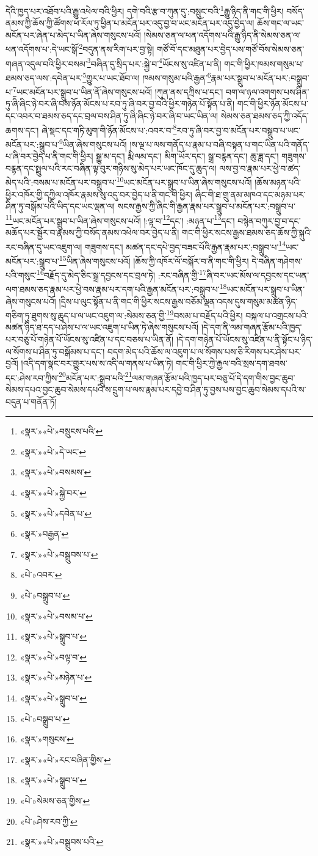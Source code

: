དེའི་ཁྱད་པར་འཐོབ་པའི་རྒྱུ་འཕེལ་བའི་ཕྱིར། དགེ་བའི་རྩ་བ་ཀུན་དུ་:བསྲུང་བའི་\footnote{«སྣར་»«པེ་»བསྲུངས་པའི་}རྒྱུ་ཉིད་ནི་གང་གི་ཕྱིར། བསོད་ནམས་ཀྱི་ཆོས་ཀྱི་ཚོགས་ཕ་རོལ་ཏུ་ཕྱིན་པ་མངོན་པར་འདུ་བྱ་བ་ཡང་མངོན་པར་འདུ་བྱེད་ལ། ཆོས་གང་ལ་ཡང་མངོན་པར་ཞེན་པ་མེད་པ་ཡིན་ཞེས་གསུངས་པའོ། །སེམས་ཅན་ལ་ཕན་འདོགས་པའི་རྒྱུ་ཉིད་ནི་སེམས་ཅན་ལ་ཕན་འདོགས་པ་:དེ་ཡང་སྒོ་\footnote{«སྣར་»«པེ་»དེ་ཡང་}བདུན་ནས་རིག་པར་བྱ་སྟེ། གཙོ་བོ་དང་མཐུན་པར་བྱེད་པས་གཙོ་བོས་སེམས་ཅན་གཞན་འདུལ་བའི་ཕྱིར་བསམ་\footnote{«སྣར་»«པེ་»བསམས་}བཞིན་དུ་སྲིད་པར་:སྐྱེ་བ་\footnote{«སྣར་»«པེ་»སྐྱེ་བར་}ཡོངས་སུ་འཛིན་པ་ནི། གང་གི་ཕྱིར་ཁམས་གསུམ་པ་ཐམས་ཅད་ལས་:དབེན་པར་\footnote{«སྣར་»«པེ་»དབེན་པ་}གྱུར་པ་ཡང་ཐོབ་ལ། ཁམས་གསུམ་པའི་རྒྱན་\footnote{«སྣར་»བརྒྱན་}རྣམ་པར་སྒྲུབ་པ་མངོན་པར་:བསྒྲུབ་པ་\footnote{«སྣར་»«པེ་»བསྒྲུབས་པ་}ཡང་མངོན་པར་སྒྲུབ་པ་ཡིན་ནོ་ཞེས་གསུངས་པའོ། །ཀུན་ནས་དཀྲིས་པ་དང་། བག་ལ་ཉལ་འགགས་པས་ཤིན་ཏུ་ཞི་ཞིང་ཉེ་བར་ཞི་བས་ཉོན་མོངས་པ་རབ་ཏུ་ཞི་བར་བྱ་བའི་ཕྱིར་གཉེན་པོ་སྟོན་པ་ནི། གང་གི་ཕྱིར་ཉོན་མོངས་པ་དང་འབར་བ་ཐམས་ཅད་དང་བྲལ་བས་ཤིན་ཏུ་ཞི་ཞིང་ཉེ་བར་ཞི་བ་ཡང་ཡིན་ལ། སེམས་ཅན་ཐམས་ཅད་ཀྱི་འདོད་ཆགས་དང་། ཞེ་སྡང་དང་གཏི་མུག་གི་ཉོན་མོངས་པ་:འབར་བ་\footnote{«པེ་»འབར་}རབ་ཏུ་ཞི་བར་བྱ་བ་མངོན་པར་བསྒྲུབ་པ་ཡང་མངོན་པར་:སྒྲུབ་པ་\footnote{«པེ་»བསྒྲུབ་པ་}ཡིན་ཞེས་གསུངས་པའོ། །ས་ལྔ་པ་ལས་གནོད་པ་རྣམ་པ་བཞི་བསྟན་པ་གང་ཡིན་པའི་གནོད་པ་ཞི་བར་བྱེད་པ་ནི་གང་གི་ཕྱིར། སྒྱུ་མ་དང་། རྨི་ལམ་དང་། མིག་ཡོར་དང་། སྒྲ་བརྙན་དང་། ཆུ་ཟླ་དང་། གཟུགས་བརྙན་དང་སྤྲུལ་པའི་རང་བཞིན་ལྟ་བུར་གཉིས་སུ་མེད་པར་ཡང་ཁོང་དུ་ཆུད་ལ། ལས་བྱ་བ་རྣམ་པར་ཕྱེ་བ་ཚད་མེད་པའི་:བསམ་པ་མངོན་པར་བསྒྲུབ་པ་\footnote{«སྣར་»«པེ་»བསམ་པ་}ཡང་མངོན་པར་སྒྲུབ་པ་ཡིན་ཞེས་གསུངས་པའོ། །ཆོས་མཉན་པའི་ཕྱིར་འཁོར་གྱི་དཀྱིལ་འཁོར་རྣམས་སུ་འདུ་བར་བྱེད་པ་ནི་གང་གི་ཕྱིར། ཞིང་གི་ཐ་གྲུ་ནམ་མཁའ་དང་མཉམ་པར་ཤིན་ཏུ་བསྒོམ་པའི་ཡིད་དང་ཡང་ལྡན་ལ། སངས་རྒྱས་ཀྱི་ཞིང་གི་རྒྱན་རྣམ་པར་སྒྲུབ་པ་མངོན་པར་:བསྒྲུབ་པ་\footnote{«སྣར་»«པེ་»སྒྲུབ་པ་}ཡང་མངོན་པར་སྒྲུབ་པ་ཡིན་ཞེས་གསུངས་པའོ། །:ལྟ་བ་\footnote{«སྣར་»«པེ་»བལྟ་བ་}དང་། :མཉན་པ་\footnote{«སྣར་»«པེ་»མཉེན་པ་}དང་། བསྙེན་བཀུར་བྱ་བ་དང་མཆོད་པར་སྦྱོར་བ་རྣམས་ཀྱི་བསོད་ནམས་འཕེལ་བར་བྱེད་པ་ནི། གང་གི་ཕྱིར་སངས་རྒྱས་ཐམས་ཅད་ཆོས་ཀྱི་སྐུའི་རང་བཞིན་དུ་ཡང་འཇུག་ལ། གཟུགས་དང་། མཚན་དང་དཔེ་བྱད་བཟང་པོའི་རྒྱན་རྣམ་པར་:བསྒྲུབ་པ་\footnote{«སྣར་»«པེ་»སྒྲུབ་པ་}ཡང་མངོན་པར་:སྒྲུབ་པ་\footnote{«པེ་»བསྒྲུབ་པ་}ཡིན་ཞེས་གསུངས་པའོ། །ཆོས་ཀྱི་འཁོར་ལོ་བསྐོར་བ་ནི་གང་གི་ཕྱིར། དེ་བཞིན་གཤེགས་པའི་གསུང་\footnote{«སྣར་»གསུངས་}བརྗོད་དུ་མེད་ཅིང་སྒྲ་དབྱངས་དང་བྲལ་ཏེ། :རང་བཞིན་གྱི་\footnote{«སྣར་»«པེ་»རང་བཞིན་གྱིས་}ཞི་བར་ཡང་མོས་ལ་དབྱངས་དང་ཡན་ལག་ཐམས་ཅད་རྣམ་པར་ཕྱེ་བས་རྣམ་པར་དག་པའི་རྒྱན་མངོན་པར་:བསྒྲུབ་པ་\footnote{«སྣར་»«པེ་»སྒྲུབ་པ་}ཡང་མངོན་པར་སྒྲུབ་པ་ཡིན་ཞེས་གསུངས་པའོ། །དྲིས་པ་ལུང་སྟོན་པ་ནི་གང་གི་ཕྱིར་སངས་རྒྱས་བཅོམ་ལྡན་འདས་དུས་གསུམ་མཚན་ཉིད་གཅིག་ཏུ་ཐུགས་སུ་ཆུད་པ་ལ་ཡང་འཇུག་ལ་:སེམས་ཅན་གྱི་\footnote{«པེ་»སེམས་ཅན་གྱིས་}བསམ་པ་བརྗོད་པའི་ཕྱིར། བསྐལ་པ་འགྲངས་པའི་མཚན་ཉིད་ཐ་དད་པ་ཤེས་པ་ལ་ཡང་འཇུག་པ་ཡིན་ཏེ་ཞེས་གསུངས་པའོ། །དེ་དག་ནི་ལམ་གཞན་རྩོམ་པའི་ཁྱད་པར་བཅུ་པོ་གཉེན་པོ་ཡོངས་སུ་འཛིན་པ་དང་བཅས་པ་ཡིན་ནོ། །དེ་དག་གཉེན་པོ་ཡོངས་སུ་འཛིན་པ་ནི་སྟོང་པ་ཉིད་ལ་སོགས་པ་ཤིན་ཏུ་བསྒོམས་པ་དང་། བདག་མེད་པའི་ཆོས་ལ་འཇུག་པ་ལ་སོགས་པས་ཅི་རིགས་པར་ཤེས་པར་བྱའོ། །འདི་དག་སྣང་བར་གྱུར་པས་ས་འདི་ལ་གནས་པ་ཡིན་ཏེ། གང་གི་ཕྱིར་ཀྱེ་རྒྱལ་བའི་སྲས་དག་ཐབས་དང་:ཤེས་རབ་ཀྱིས་\footnote{«པེ་»ཤེས་རབ་ཀྱི་}མངོན་པར་:སྒྲུབ་པའི་\footnote{«སྣར་»«པེ་»བསྒྲུབས་པའི་}ལམ་གཞན་རྩོམ་པའི་ཁྱད་པར་བཅུ་པོ་དེ་དག་གིས་བྱང་ཆུབ་སེམས་དཔའ་བྱང་ཆུབ་སེམས་དཔའི་ས་དྲུག་པ་ལས་རྣམ་པར་དབྱེ་བ་ཤིན་ཏུ་བྱས་པས་བྱང་ཆུབ་སེམས་དཔའི་ས་བདུན་པ་གནོན་ཏོ། 